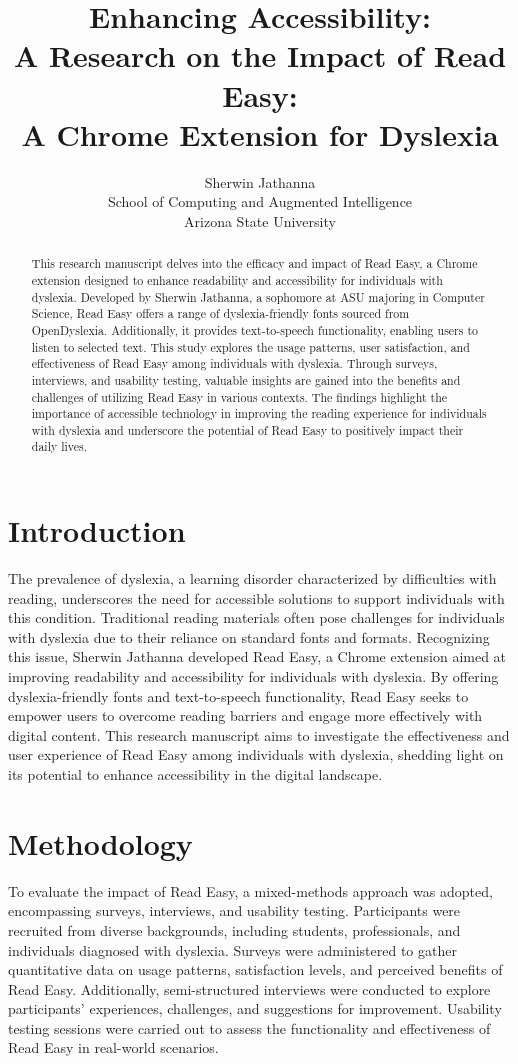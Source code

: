 \documentclass{article}
\title{Enhancing Accessibility:\\  A Research on the Impact of Read Easy:\\ A Chrome Extension for Dyslexia}
\author{Sherwin Jathanna \\ School of Computing and Augmented Intelligence\\
Arizona State University \\
}
\date{}
\begin{document}
\maketitle

\begin{abstract}
This research manuscript delves into the efficacy and impact of Read Easy, a Chrome extension designed to enhance readability and accessibility for individuals with dyslexia. Developed by Sherwin Jathanna, a sophomore at ASU majoring in Computer Science, Read Easy offers a range of dyslexia-friendly fonts sourced from OpenDyslexia. Additionally, it provides text-to-speech functionality, enabling users to listen to selected text. This study explores the usage patterns, user satisfaction, and effectiveness of Read Easy among individuals with dyslexia. Through surveys, interviews, and usability testing, valuable insights are gained into the benefits and challenges of utilizing Read Easy in various contexts. The findings highlight the importance of accessible technology in improving the reading experience for individuals with dyslexia and underscore the potential of Read Easy to positively impact their daily lives.
\end{abstract}

\section{Introduction}
The prevalence of dyslexia, a learning disorder characterized by difficulties with reading, underscores the need for accessible solutions to support individuals with this condition. Traditional reading materials often pose challenges for individuals with dyslexia due to their reliance on standard fonts and formats. Recognizing this issue, Sherwin Jathanna developed Read Easy, a Chrome extension aimed at improving readability and accessibility for individuals with dyslexia. By offering dyslexia-friendly fonts and text-to-speech functionality, Read Easy seeks to empower users to overcome reading barriers and engage more effectively with digital content. This research manuscript aims to investigate the effectiveness and user experience of Read Easy among individuals with dyslexia, shedding light on its potential to enhance accessibility in the digital landscape.

\section{Methodology}
To evaluate the impact of Read Easy, a mixed-methods approach was adopted, encompassing surveys, interviews, and usability testing. Participants were recruited from diverse backgrounds, including students, professionals, and individuals diagnosed with dyslexia. Surveys were administered to gather quantitative data on usage patterns, satisfaction levels, and perceived benefits of Read Easy. Additionally, semi-structured interviews were conducted to explore participants' experiences, challenges, and suggestions for improvement. Usability testing sessions were carried out to assess the functionality and effectiveness of Read Easy in real-world scenarios.
\end{document}
